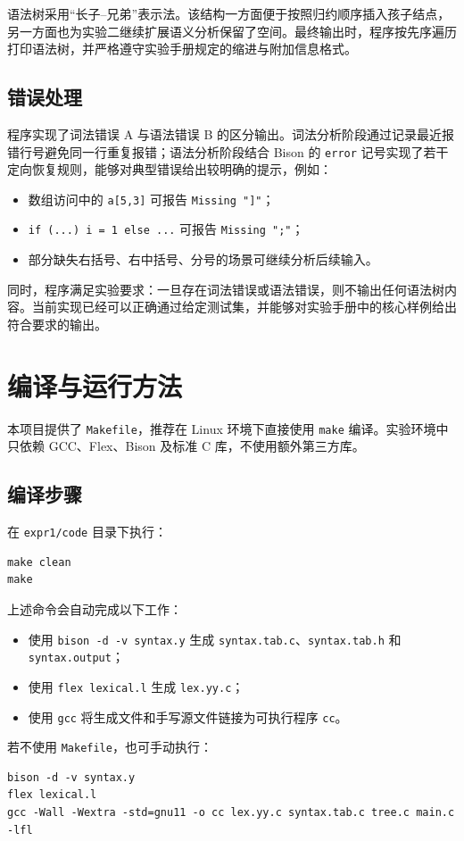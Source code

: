\documentclass[11pt,a4paper]{ctexart}
\newcommand{\code}[1]{\texttt{#1}}
\begin{document}
语法树采用“长子--兄弟”表示法。该结构一方面便于按照归约顺序插入孩子结点，另一方面也为实验二继续扩展语义分析保留了空间。最终输出时，程序按先序遍历打印语法树，并严格遵守实验手册规定的缩进与附加信息格式。

\subsection{错误处理}
程序实现了词法错误 A 与语法错误 B 的区分输出。词法分析阶段通过记录最近报错行号避免同一行重复报错；语法分析阶段结合 Bison 的 \code{error} 记号实现了若干定向恢复规则，能够对典型错误给出较明确的提示，例如：
\begin{itemize}
  \item 数组访问中的 \code{a[5,3]} 可报告 \code{Missing "]"}；
  \item \code{if (...) i = 1 else ...} 可报告 \code{Missing ";"}；
  \item 部分缺失右括号、右中括号、分号的场景可继续分析后续输入。
\end{itemize}
同时，程序满足实验要求：一旦存在词法错误或语法错误，则不输出任何语法树内容。当前实现已经可以正确通过给定测试集，并能够对实验手册中的核心样例给出符合要求的输出。

\section{编译与运行方法}
本项目提供了 \code{Makefile}，推荐在 Linux 环境下直接使用 \code{make} 编译。实验环境中只依赖 GCC、Flex、Bison 及标准 C 库，不使用额外第三方库。

\subsection{编译步骤}
在 \code{expr1/code} 目录下执行：
\begin{Verbatim}[fontsize=\small]
make clean
make
\end{Verbatim}

上述命令会自动完成以下工作：
\begin{itemize}
  \item 使用 \code{bison -d -v syntax.y} 生成 \code{syntax.tab.c}、\code{syntax.tab.h} 和 \code{syntax.output}；
  \item 使用 \code{flex lexical.l} 生成 \code{lex.yy.c}；
  \item 使用 \code{gcc} 将生成文件和手写源文件链接为可执行程序 \code{cc}。
\end{itemize}

若不使用 \code{Makefile}，也可手动执行：
\begin{Verbatim}[fontsize=\small]
bison -d -v syntax.y
flex lexical.l
gcc -Wall -Wextra -std=gnu11 -o cc lex.yy.c syntax.tab.c tree.c main.c -lfl
\end{Verbatim}
\end{document}
